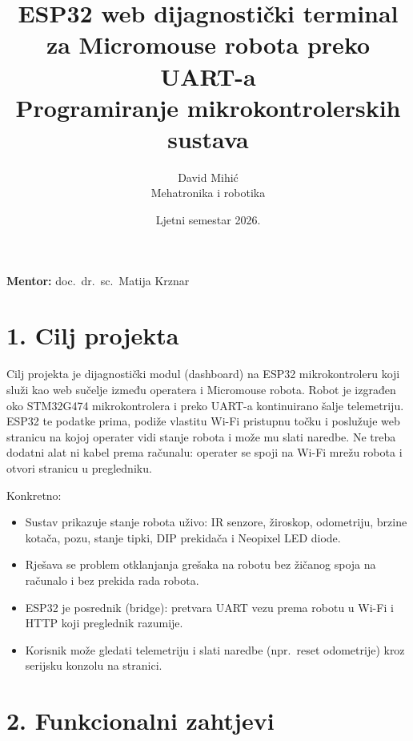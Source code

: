 \documentclass[10pt,a4paper]{article}
\title{
	\textbf{ESP32 web dijagnostički terminal za Micromouse robota preko UART-a}\\[2mm]
	\large Programiranje mikrokontrolerskih sustava
}
\author{
	David Mihić\\
	Mehatronika i robotika
}
\date{
	Ljetni semestar 2026.
}
\begin{document}
\maketitle

\begin{center}
	\textbf{Mentor:} doc.\ dr.\ sc.\ Matija Krznar
\end{center}

\newpage

\section*{1. Cilj projekta}

Cilj projekta je dijagnostički modul (dashboard) na ESP32 mikrokontroleru koji služi kao web sučelje između operatera i Micromouse robota. Robot je izgrađen oko STM32G474 mikrokontrolera i preko UART-a kontinuirano šalje telemetriju. ESP32 te podatke prima, podiže vlastitu Wi-Fi pristupnu točku i poslužuje web stranicu na kojoj operater vidi stanje robota i može mu slati naredbe. Ne treba dodatni alat ni kabel prema računalu: operater se spoji na Wi-Fi mrežu robota i otvori stranicu u pregledniku.

Konkretno:
\begin{itemize}
	\item Sustav prikazuje stanje robota uživo: IR senzore, žiroskop, odometriju, brzine kotača, pozu, stanje tipki, DIP prekidača i Neopixel LED diode.
	\item Rješava se problem otklanjanja grešaka na robotu bez žičanog spoja na računalo i bez prekida rada robota.
	\item ESP32 je posrednik (bridge): pretvara UART vezu prema robotu u Wi-Fi i HTTP koji preglednik razumije.
	\item Korisnik može gledati telemetriju i slati naredbe (npr.\ reset odometrije) kroz serijsku konzolu na stranici.
\end{itemize}

\section*{2. Funkcionalni zahtjevi}
\end{document}
